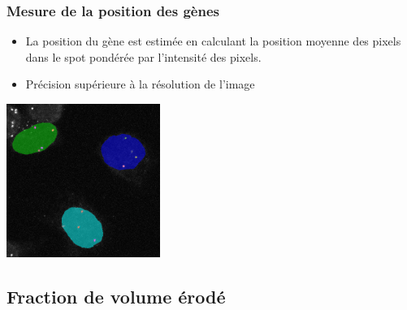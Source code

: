 \documentclass{beamer}
\begin{document}
    \frame
    {
      \frametitle{Mesure de la position des gènes}
      \begin{itemize}
        \item<1-> La position du gène est estimée en calculant la position moyenne des pixels dans le spot pondérée par l'intensité des pixels.
        \item<2-> Précision supérieure à la résolution de l'image
      \end{itemize}
      \begin{center}
        \includegraphics[height=5cm]{cas-overlay.png}
      \end{center} 
    }
    
  \subsection{Fraction de volume érodé}
    
\end{document}

